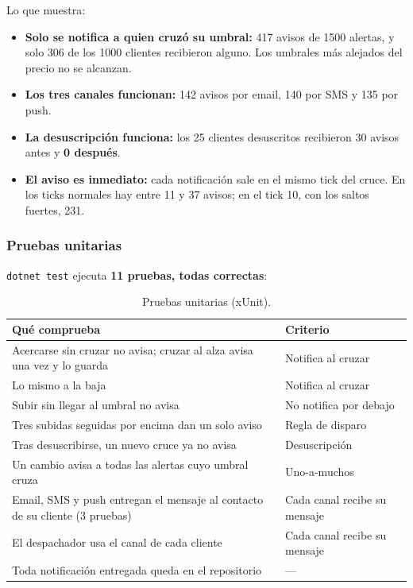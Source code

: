 Lo que muestra:
\begin{itemize}
  \item \textbf{Solo se notifica a quien cruzó su umbral:} 417 avisos de 1500 alertas, y
        solo 306 de los 1000 clientes recibieron alguno. Los umbrales más alejados del precio
        no se alcanzan.
  \item \textbf{Los tres canales funcionan:} 142 avisos por email, 140 por SMS y 135 por push.
  \item \textbf{La desuscripción funciona:} los 25 clientes desuscritos recibieron 30 avisos
        antes y \textbf{0 después}.
  \item \textbf{El aviso es inmediato:} cada notificación sale en el mismo tick del cruce. En
        los ticks normales hay entre 11 y 37 avisos; en el tick 10, con los saltos fuertes, 231.
\end{itemize}

\subsubsection{Pruebas unitarias}

\texttt{dotnet test} ejecuta \textbf{11 pruebas, todas correctas}:

\begin{table}[H]
\centering
\small
\begin{tabularx}{\textwidth}{>{\raggedright\arraybackslash}X >{\raggedright\arraybackslash}p{4cm}}
\toprule
\textbf{Qué comprueba} & \textbf{Criterio} \\
\midrule
Acercarse sin cruzar no avisa; cruzar al alza avisa una vez y lo guarda & Notifica al cruzar \\
Lo mismo a la baja & Notifica al cruzar \\
Subir sin llegar al umbral no avisa & No notifica por debajo \\
Tres subidas seguidas por encima dan un solo aviso & Regla de disparo \\
Tras desuscribirse, un nuevo cruce ya no avisa & Desuscripción \\
Un cambio avisa a todas las alertas cuyo umbral cruza & Uno-a-muchos \\
Email, SMS y push entregan el mensaje al contacto de su cliente (3 pruebas) & Cada canal recibe su mensaje \\
El despachador usa el canal de cada cliente & Cada canal recibe su mensaje \\
Toda notificación entregada queda en el repositorio & --- \\
\bottomrule
\end{tabularx}
\caption{Pruebas unitarias (xUnit).}
\end{table}

